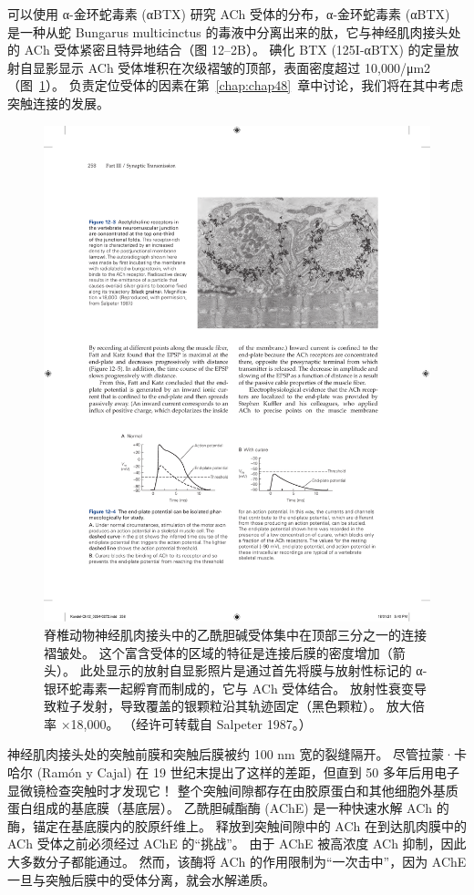 可以使用 α-金环蛇毒素 (αBTX) 研究 ACh 受体的分布，α-金环蛇毒素 (αBTX) 是一种从蛇 Bungarus multicinctus 的毒液中分离出来的肽，它与神经肌肉接头处的 ACh 受体紧密且特异地结合（图 12–2B）。 
碘化 BTX (125I-αBTX) 的定量放射自显影显示 ACh 受体堆积在次级褶皱的顶部，表面密度超过 10,000/μm2（图~\ref{fig:12_3}）。
负责定位受体的因素在第~\ref{chap:chap48}~章中讨论，我们将在其中考虑突触连接的发展。


\begin{figure}[htbp]
	\centering
	\includegraphics[width=0.6\linewidth]{chap12/fig_12_3}
	\caption{脊椎动物神经肌肉接头中的乙酰胆碱受体集中在顶部三分之一的连接褶皱处。
		这个富含受体的区域的特征是连接后膜的密度增加（箭头）。
		此处显示的放射自显影照片是通过首先将膜与放射性标记的 α-银环蛇毒素一起孵育而制成的，它与 ACh 受体结合。
		放射性衰变导致粒子发射，导致覆盖的银颗粒沿其轨迹固定（黑色颗粒）。
		放大倍率 ×18,000。 （经许可转载自 Salpeter 1987。）}
	\label{fig:12_3}
\end{figure}



神经肌肉接头处的突触前膜和突触后膜被约 100 nm 宽的裂缝隔开。
尽管拉蒙·卡哈尔 (Ramón y Cajal) 在 19 世纪末提出了这样的差距，但直到 50 多年后用电子显微镜检查突触时才发现它！
整个突触间隙都存在由胶原蛋白和其他细胞外基质蛋白组成的基底膜（基底层）。
乙酰胆碱酯酶 (AChE) 是一种快速水解 ACh 的酶，锚定在基底膜内的胶原纤维上。
释放到突触间隙中的 ACh 在到达肌肉膜中的 ACh 受体之前必须经过 AChE 的“挑战”。
由于 AChE 被高浓度 ACh 抑制，因此大多数分子都能通过。
然而，该酶将 ACh 的作用限制为“一次击中”，因为 AChE 一旦与突触后膜中的受体分离，就会水解递质。



